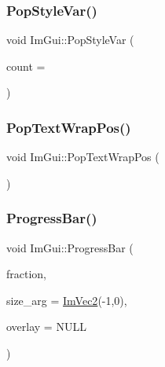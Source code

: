 \hypertarget{namespace_im_gui_a14116e57d81e326adef2a702e65781d4}{}\label{namespace_im_gui_a14116e57d81e326adef2a702e65781d4} 
\subsubsection{\texorpdfstring{Pop\+Style\+Var()}{PopStyleVar()}}
{\footnotesize\ttfamily void Im\+Gui\+::\+Pop\+Style\+Var (\begin{DoxyParamCaption}\item[{int}]{count = {} }\end{DoxyParamCaption})}

\hypertarget{namespace_im_gui_a08000421b9cc13757430efe54178ae0f}{}\label{namespace_im_gui_a08000421b9cc13757430efe54178ae0f} 
\subsubsection{\texorpdfstring{Pop\+Text\+Wrap\+Pos()}{PopTextWrapPos()}}
{\footnotesize\ttfamily void Im\+Gui\+::\+Pop\+Text\+Wrap\+Pos (\begin{DoxyParamCaption}{ }\end{DoxyParamCaption})}

\hypertarget{namespace_im_gui_a83349d38c7c73f92ae977bc5b530a9e9}{}\label{namespace_im_gui_a83349d38c7c73f92ae977bc5b530a9e9} 
\subsubsection{\texorpdfstring{Progress\+Bar()}{ProgressBar()}}
{\footnotesize\ttfamily void Im\+Gui\+::\+Progress\+Bar (\begin{DoxyParamCaption}\item[{float}]{fraction,  }\item[{const \hyperlink{struct_im_vec2}{Im\+Vec2} \&}]{size\+\_\+arg = {\ttfamily \hyperlink{struct_im_vec2}{Im\+Vec2}(-\/1,0)},  }\item[{const char $\ast$}]{overlay = {\ttfamily NULL} }\end{DoxyParamCaption})}

\hypertarget{namespace_im_gui_adf7c3cfdcbb06617bb70ff1526d064f4}{}\label{namespace_im_gui_adf7c3cfdcbb06617bb70ff1526d064f4} 
